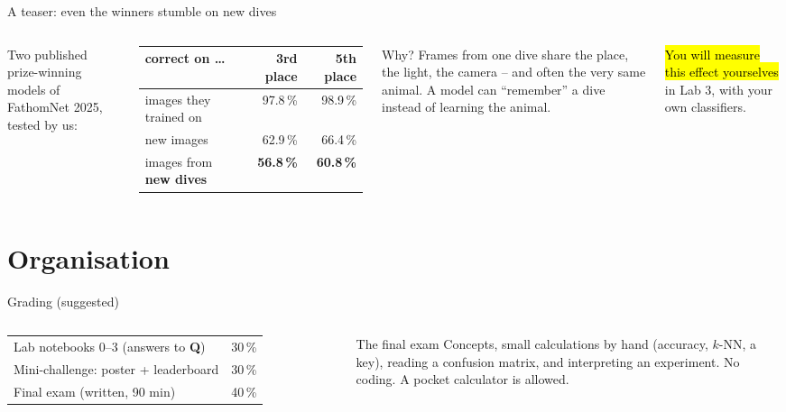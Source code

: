 \documentclass[aspectratio=169,11pt]{beamer}
\begin{document}
\begin{frame}{A teaser: even the winners stumble on new dives}
\begin{columns}[c]
Two published prize-winning models of FathomNet 2025, tested by us:\\[4pt]
\small
\begin{tabular}{@{}lrr@{}}
\toprule
correct on \dots & 3rd place & 5th place \\
\midrule
images they trained on & 97.8\,\% & 98.9\,\% \\
new images & 62.9\,\% & 66.4\,\% \\
images from \textbf{new dives} & \textbf{56.8\,\%} & \textbf{60.8\,\%} \\
\bottomrule
\end{tabular}
\begin{alertblock}{Why?}
Frames from one dive share the place, the light, the camera -- and often the very same animal. A model can ``remember'' a dive instead of learning the animal.
\end{alertblock}
\vspace{2pt}
\hl{You will measure this effect yourselves} in Lab 3, with your own classifiers.
\end{columns}
\end{frame}

\section{Organisation}

\begin{frame}{Grading (suggested)}
\begin{columns}[T]
\begin{tabular}{@{}lr@{}}
\toprule
Lab notebooks 0--3 (answers to \textbf{\color{coral}Q}) & 30\,\% \\
Mini-challenge: poster + leaderboard & 30\,\% \\
Final exam (written, 90 min) & 40\,\% \\
\bottomrule
\end{tabular}
\begin{block}{The final exam}
Concepts, small calculations by hand (accuracy, $k$-NN, a key), reading a confusion matrix, and interpreting an experiment. No coding. A pocket calculator is allowed.
\end{block}
\end{columns}
\vspace{8pt}
\end{frame}
\end{document}
